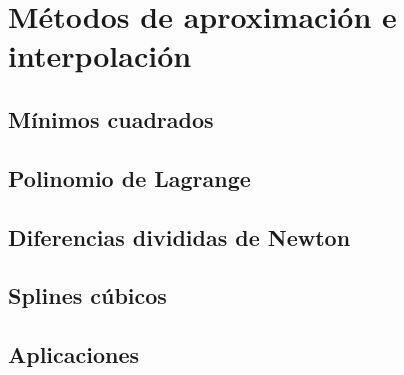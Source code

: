 \chapter{Métodos de aproximación e interpolación}

\section{Mínimos cuadrados}

\section{Polinomio de Lagrange}

\section{Diferencias divididas de Newton}

\section{Splines cúbicos}

\section{Aplicaciones}